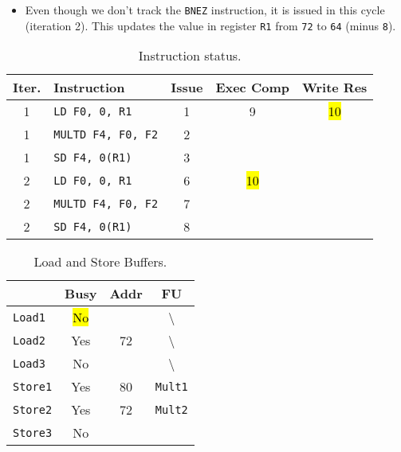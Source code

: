 \begin{enumerate}
\begin{itemize}
        \item Even though we don't track the \texttt{BNEZ} instruction, it is issued in this cycle (iteration 2). This updates the value in register \texttt{R1} from \texttt{72} to \texttt{64} (minus \texttt{8}).
    \end{itemize}
    \begin{table}[!htp]
        \centering
        \begin{tabular}{@{} c l | c c c @{}}
            \toprule
            Iter.       & Instruction                   & Issue & Exec Comp & Write Res \\
            \midrule
            1           & \texttt{LD    F0, 0, R1}      & 1     & 9         & \hl{10}   \\ [.3em]
            1           & \texttt{MULTD F4, F0, F2}     & 2     &           &           \\ [.3em]
            1           & \texttt{SD    F4, 0(R1)}      & 3     &           &           \\ [.3em]
            2           & \texttt{LD    F0, 0, R1}      & 6     & \hl{10}   &           \\ [.3em]
            2           & \texttt{MULTD F4, F0, F2}     & 7     &           &           \\ [.3em]
            2           & \texttt{SD    F4, 0(R1)}      & 8     &           &           \\
            \bottomrule
        \end{tabular}
        \caption*{Instruction status.}
    \end{table}

    \begin{table}[!htp]
        \centering
        \begin{tabular}{@{} l | c c c @{}}
            \toprule
                                & Busy      & Addr      & FU   \\
            \midrule
            \texttt{Load1}      & \hl{No}   &           & \textbackslash        \\ [.3em]
            \texttt{Load2}      & Yes       & 72        & \textbackslash        \\ [.3em]
            \texttt{Load3}      & No        &           & \textbackslash        \\
            \cmidrule{1-4}
            \texttt{Store1}     & Yes       & 80        & \texttt{Mult1}        \\ [.3em]
            \texttt{Store2}     & Yes       & 72        & \texttt{Mult2}        \\ [.3em]
            \texttt{Store3}     & No        &           &                       \\
            \bottomrule
        \end{tabular}
        \caption*{Load and Store Buffers.}
    \end{table}


\end{enumerate}
